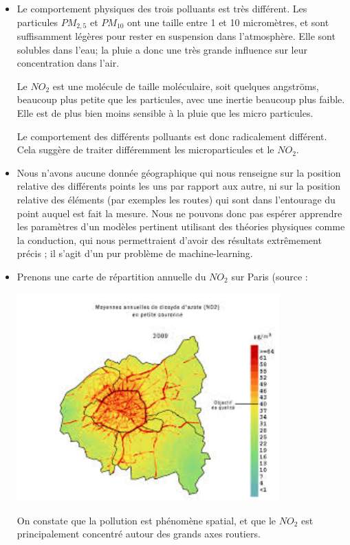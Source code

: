 \begin{itemize}
  \item
    Le comportement physiques des trois polluants est très différent.
    Les particules $PM_{2,5}$ et $PM_{10}$ ont une taille entre 1 et 10 micromètres, et sont suffisamment légères pour rester en suspension dans l'atmosphère. Elle sont solubles dans l'eau; la pluie a donc une très grande influence sur leur concentration dans l'air.
    
    Le $NO_2$ est une molécule de taille moléculaire, soit quelques angströms, beaucoup plus petite que les particules, avec une inertie beaucoup plus faible. Elle est de plus bien moins sensible à la pluie que les micro particules.
    
    Le comportement des différents polluants est donc radicalement différent.
    Cela suggère de traiter différemment les microparticules et le $NO_2$.
  \item
    Nous n'avons aucune donnée géographique qui nous renseigne sur la position relative des différents points les uns par rapport aux autre, ni sur la position relative des éléments (par exemples les routes) qui sont dans l'entourage du point auquel est fait la mesure.
   Nous ne pouvons donc pas espérer apprendre les paramètres d'un modèles pertinent utilisant des théories physiques comme la conduction, qui nous permettraient d'avoir des résultats extrêmement précis ; il s'agit d'un pur problème de machine-learning.
	\item
    Prenons une carte de répartition annuelle du $NO_2$ sur Paris (source : \cite{pollutionWebsite1}
    \begin{center}
    	\includegraphics[height=8cm]{images/parisno2.jpg}
    \end{center}
    On constate que la pollution est phénomène spatial, et que le $NO_2$ est principalement concentré autour des grands axes routiers.

\end{itemize}
